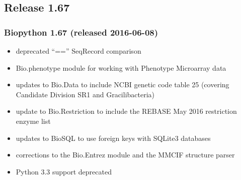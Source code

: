 \documentclass[trans]{beamer}
\begin{document}
\subsection*{Release 1.67}
\frame
{
  \frametitle{Biopython 1.67 (released 2016-06-08)}

  \begin{itemize}
  \item deprecated ``=='' SeqRecord comparison
  \item Bio.phenotype module for working with Phenotype Microarray data
  \item updates to Bio.Data to include NCBI genetic code table 25 (covering Candidate Division SR1 and Gracilibacteria)
  \item update to Bio.Restriction to include the REBASE May 2016 restriction enzyme list
  \item updates to BioSQL to use foreign keys with SQLite3 databases
  \item corrections to the Bio.Entrez module and the MMCIF structure parser
  \item Python 3.3 support deprecated
  \end{itemize}
}
\frame
\end{document}
